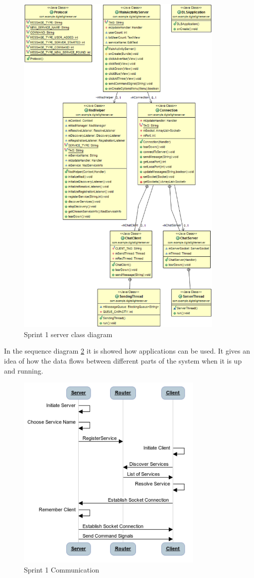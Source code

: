 \begin{figure}[H]
	\centering
		\includegraphics[width=10cm]{sprint1/class_diagram_server.png}
	\caption{Sprint 1 server class diagram}
	\label{fig:class_diagram_server}
\end{figure}

In the sequence diagram \ref{fig:sprint1_communication} it is showed how applications can be used. It gives an idea of how the data flows between different parts of the system when it is up and running.

\begin{figure}[H]
	\centering
		\includegraphics[width=9cm]{sprint1/communication.png}
	\caption{Sprint 1 Communication}
	\label{fig:sprint1_communication}
\end{figure}

